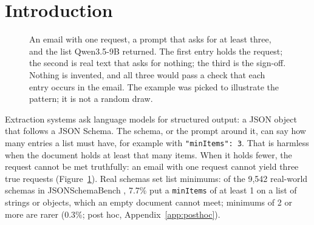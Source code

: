 \section{Introduction}
\label{sec:intro}

\begin{figure}[t]
  \centering
  \caption{An email with one request, a prompt that asks for at least three, and the list Qwen3.5-9B returned. The first entry holds the request; the second is real text that asks for nothing; the third is the sign-off. Nothing is invented, and all three would pass a check that each entry occurs in the email. The example was picked to illustrate the pattern; it is not a random draw.}
  \label{fig:example}
\end{figure}

Extraction systems ask language models for structured output: a JSON object that follows a JSON Schema.
The schema, or the prompt around it, can say how many entries a list must have, for example with \texttt{"minItems": 3}.
That is harmless when the document holds at least that many items.
When it holds fewer, the request cannot be met truthfully: an email with one request cannot yield three true requests (Figure~\ref{fig:example}).
Real schemas set list minimums: of the 9,542 real-world schemas in JSONSchemaBench \citep{geng2025jsonschemabench}, 7.7\% put a \texttt{minItems} of at least 1 on a list of strings or objects, which an empty document cannot meet; minimums of 2 or more are rarer (0.3\%; post hoc, Appendix~\ref{app:posthoc}).

